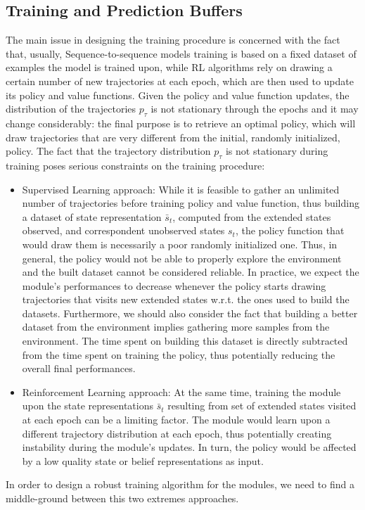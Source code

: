         \subsection{Training and Prediction Buffers}
        \label{sub:dtrpo_buffers}
            The main issue in designing the training procedure is concerned with the fact that, usually, Sequence-to-sequence models training is based on a fixed dataset of examples the model is trained upon, while RL algorithms rely on drawing a certain number of new trajectories at each epoch, which are then used to update its policy and value functions. Given the policy and value function updates, the distribution of the trajectories $p_{\tau}$ is not stationary through the epochs and it may change considerably: the final purpose is to retrieve an optimal policy, which will draw trajectories that are very different from the initial, randomly initialized, policy.
            The fact that the trajectory distribution $p_{\tau}$ is not stationary during training poses serious constraints on the training procedure:
            \begin{itemize}
                \setlength\itemsep{0.05em}
                \item Supervised Learning approach: While it is feasible to gather an unlimited number of trajectories before training policy and value function, thus building a dataset of state representation $\bar{s}_t$, computed from the extended states observed, and correspondent unobserved states $s_t$, the policy function that would draw them is necessarily a poor randomly initialized one. Thus, in general, the policy would not be able to properly explore the environment and the built dataset cannot be considered reliable. In practice, we expect the module's performances to decrease whenever the policy starts drawing trajectories that visits new extended states w.r.t. the ones used to build the datasets. Furthermore, we should also consider the fact that building a better dataset from the environment implies gathering more samples from the environment. The time spent on building this dataset is directly subtracted from the time spent on training the policy, thus potentially reducing the overall final performances.
                \item Reinforcement Learning approach: At the same time, training the module upon the state representations $\bar{s}_t$ resulting from set of extended states visited at each epoch can be a limiting factor. The module would learn upon a different trajectory distribution at each epoch, thus potentially creating instability during the module's updates. In turn, the policy would be affected by a low quality state or belief representations as input.
            \end{itemize}
            \noindent
            In order to design a robust training algorithm for the modules, we need to find a middle-ground between this two extremes approaches.
            
